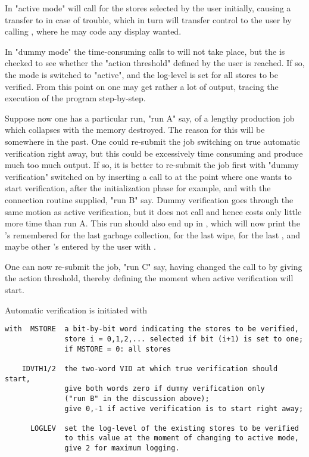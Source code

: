 In "active mode"  will call  for the stores selected
by the user initially, causing a transfer to  in case of trouble,
which in turn will transfer control to the user by calling ,
where he may code any display wanted.

In "dummy mode" the time-consuming calls to  will not take place,
but the  is checked to see whether the "action threshold" defined
by the user is reached. If so, the mode is switched to "active", and
the log-level is set for all stores to be verified.
From this point on one may get rather a lot of output, tracing the
execution of the program step-by-step.

Suppose now one has a particular run, "run A" say, of a lengthy
production job which collapses with the memory destroyed.
The reason for this will be somewhere in the past.
One could re-submit the job switching on true automatic verification 
right away, but this could be excessively time consuming and produce
much too much output.
If so, it is better to re-submit the job first with "dummy verification"
switched on by inserting a call to  at the point where one wants
to start verification, after the initialization phase for example,
and with the connection routine  supplied,
"run B" say.
Dummy verification goes through the
same motion as active verification, but it does not call 
and hence costs only little more time than run A. This run should also
end up in , which will now print the 's remembered for the last
garbage collection, for the last wipe, for the last ,
and maybe other 's entered by the user with .

One can now re-submit the job, "run C" say, having changed the call to
 by giving the action threshold, thereby defining the moment
when active verification will start.

Automatic verification is initiated with


\begin{verbatim}
with  MSTORE  a bit-by-bit word indicating the stores to be verified,
              store i = 0,1,2,... selected if bit (i+1) is set to one;
              if MSTORE = 0: all stores

    IDVTH1/2  the two-word VID at which true verification should start,
              give both words zero if dummy verification only
              ("run B" in the discussion above);
              give 0,-1 if active verification is to start right away;

      LOGLEV  set the log-level of the existing stores to be verified
              to this value at the moment of changing to active mode,
              give 2 for maximum logging.
\end{verbatim} 

